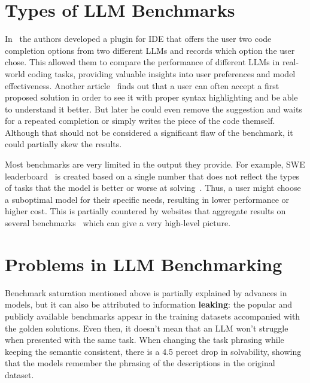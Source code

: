\section{Types of LLM Benchmarks}




In~\cite{chi2025copilotarenaplatformcode} the authors developed a plugin for IDE that offers the user two code completion options from two different LLMs and records which option the user chose. This allowed them to compare the performance of different LLMs in real-world coding tasks, providing valuable insights into user preferences and model effectiveness.
Another article~\cite{mozannar2024readinglinesmodelinguser} finds out that a user can often accept a first proposed solution in order to see it with proper syntax highlighting and be able to understand it better. But later he could even remove the suggestion and waits for a repeated completion or simply writes the piece of the code themself. Although that should not be considered a significant flaw of the benchmark, it could partially skew the results.

Most benchmarks are very limited in the output they provide. For example, SWE leaderboard~\cite{swebenchSWEbenchLeaderboards} is created based on a single number that does not reflect the types of tasks that the model is better or worse at solving~\cite{miah2024usercentricevaluationcode}. Thus, a user might choose a suboptimal model for their specific needs, resulting in lower performance or higher cost. This is partially countered by websites that aggregate results on several benchmarks~\cite{vellumLeaderboard2025} which can give a very high-level picture.

\section{Problems in LLM Benchmarking}


Benchmark saturation mentioned above is partially explained by advances in models, but it can also be attributed to information \textbf{leaking}: the popular and publicly available benchmarks appear in the training datasets accompanied with the golden solutions. 
Even then, it doesn't mean that an LLM won't struggle when presented with the same task. 
When changing the task phrasing while keeping the semantic consistent, there is a 4.5 percet drop in solvability, showing that the models remember the phrasing of the descriptions in the original dataset. \cite{uniyal2024one}


